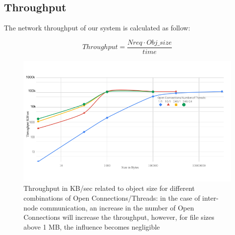 \documentclass[runningheads]{llncs}
\begin{document}
\subsection{Throughput}
\begin{minipage}{0.5\textwidth}
The network throughput of our system is calculated as follow:
\end{minipage}
\begin{minipage}{0.5\textwidth}
\[Throughput=\frac{Nreq \cdot Obj\_size}{time}\]
\end{minipage}
\vspace{-1.5em}
\begin{figure}
\includegraphics[width=1.0\textwidth]{throughput-to-size.png}\vspace{-4.5em}
\caption{Throughput in KB/sec related to object size for different combinations of Open Connections/Threads: in the case of inter-node communication, an increase in the number of Open Connections will increase the throughput, however, for file sizes above 1 MB, the influence becomes negligible}
\vspace{-2.5em}
\label{fig:throughput-to-size}
\end{figure}
\end{document}
